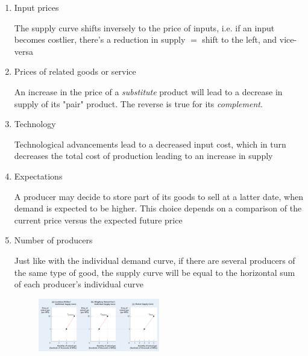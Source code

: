\documentclass[english,course, draft]{Notes}
\newcommand{\ita}[1]{\textit{#1}}
\begin{document}
\begin{enumerate}
	\item Input prices
	
	
	\par{The supply curve shifts inversely to the price of inputs, i.e. if an input becomes costlier, there's a reduction in supply $=$ shift to the left, and vice-versa}
	
	\item Prices of related goods or service
	
	\par{An increase in the price of a \ita{substitute} product will lead to a decrease in supply of its "pair" product. The reverse is true for its \ita{complement}.}
	

	\item Technology
	
	\par{Technological advancements lead to a decreased input cost, which in turn decreases the total cost of production leading to an increase in supply}
	
	\item Expectations
	
	\par{A producer may decide to store part of its goods to sell at a latter date, when demand is expected to be higher. This choice depends on a comparison of the current price versus the expected future price}
	
	\item Number of producers
	
	\par{Just like with the individual demand curve, if there are several producers of the same type of good, the supply curve will be equal to the horizontal sum of each producer's individual curve}
	
	\begin{figure}[ht]
\centering
\includegraphics[width=0.5\textwidth]{supplyIndividual}
\end{figure}

\end{enumerate}
\end{document}
